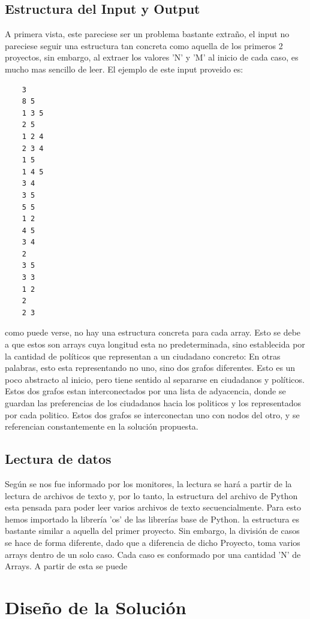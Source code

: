 \documentclass[a4paper]{article}
\begin{document}
\subsection{Estructura del Input y Output}
A primera vista, este pareciese ser un problema bastante extraño, el input no pareciese seguir una estructura tan
concreta como aquella de los primeros 2 proyectos, sin embargo, al extraer los valores 'N' y 'M' al inicio de cada
caso, es mucho mas sencillo de leer. El ejemplo de este input proveido es:

\begin{verbatim}
    3
    8 5
    1 3 5
    2 5
    1 2 4
    2 3 4
    1 5
    1 4 5
    3 4
    3 5
    5 5
    1 2
    4 5
    3 4
    2
    3 5
    3 3
    1 2
    2
    2 3
\end{verbatim}

como puede verse, no hay una estructura concreta para cada array. Esto se debe a que estos son 
arrays cuya longitud esta no predeterminada, sino establecida por la cantidad de políticos
que representan a un ciudadano concreto: En otras palabras, esto esta representando no uno, sino 
dos grafos diferentes. Esto es un poco abstracto al inicio, pero tiene sentido al separarse en 
ciudadanos y políticos. Estos dos grafos estan interconectados por una lista de adyacencia, donde
se guardan las preferencias de los ciudadanos hacia los politicos y los representados por cada politico.
Estos dos grafos se interconectan uno con nodos del otro, y se referencian constantemente en la solución
propuesta.

\subsection{Lectura de datos}
Según se nos fue informado por los monitores, la lectura se hará a partir de la lectura
de archivos de texto y, por lo tanto, la estructura del archivo de Python esta pensada para
poder leer varios archivos de texto secuencialmente. Para esto hemos importado la librería 'os'
de las librerías base de Python. la estructura es bastante similar a aquella del primer proyecto.
Sin embargo, la división de casos se hace de forma diferente, dado que a diferencia de dicho Proyecto,
toma varios arrays dentro de un solo caso. Cada caso es conformado por una cantidad 'N' de Arrays.
A partir de esta se puede 
\section{Diseño de la Solución}
\end{document}
